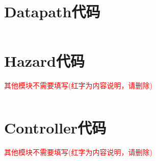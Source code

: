 \appendix
\section{Datapath代码}

\begin{lstlisting}[language=Verilog]

\end{lstlisting}

\section{Hazard代码}
\textcolor{red}{其他模块不需要填写(红字为内容说明，请删除)}
\begin{lstlisting}[language=Verilog]

\end{lstlisting}

\section{Controller代码}
\textcolor{red}{其他模块不需要填写(红字为内容说明，请删除)}
\begin{lstlisting}[language=Verilog]

\end{lstlisting}